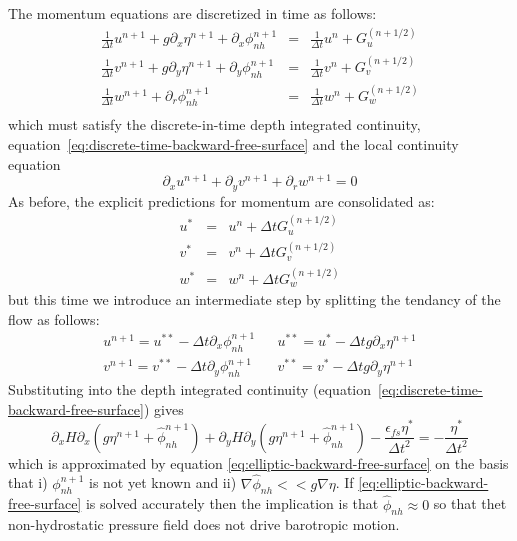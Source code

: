 The momentum equations are discretized in time as follows:
\begin{eqnarray}
\frac{1}{\Delta t} u^{n+1} + g \partial_x \eta^{n+1} + \partial_x \phi_{nh}^{n+1}
& = & \frac{1}{\Delta t} u^{n} + G_u^{(n+1/2)} \label{eq:discrete-time-u-nh} \\
\frac{1}{\Delta t} v^{n+1} + g \partial_y \eta^{n+1} + \partial_y \phi_{nh}^{n+1}
& = & \frac{1}{\Delta t} v^{n} + G_v^{(n+1/2)} \label{eq:discrete-time-v-nh} \\
\frac{1}{\Delta t} w^{n+1} + \partial_r \phi_{nh}^{n+1}
& = & \frac{1}{\Delta t} w^{n} + G_w^{(n+1/2)} \label{eq:discrete-time-w-nh} \\
\end{eqnarray}
which must satisfy the discrete-in-time depth integrated continuity,
equation~\ref{eq:discrete-time-backward-free-surface} and the local continuity equation
\begin{equation}
\partial_x u^{n+1} + \partial_y v^{n+1} + \partial_r w^{n+1} = 0
\label{eq:non-divergence-nh}
\end{equation}
As before, the explicit predictions for momentum are consolidated as:
\begin{eqnarray*}
u^* & = & u^n + \Delta t G_u^{(n+1/2)} \\
v^* & = & v^n + \Delta t G_v^{(n+1/2)} \\
w^* & = & w^n + \Delta t G_w^{(n+1/2)}
\end{eqnarray*}
but this time we introduce an intermediate step by splitting the
tendancy of the flow as follows:
\begin{eqnarray}
u^{n+1} = u^{**} - \Delta t \partial_x \phi_{nh}^{n+1}
& &
u^{**} = u^{*} - \Delta t g \partial_x \eta^{n+1} \\
v^{n+1} = v^{**} - \Delta t \partial_y \phi_{nh}^{n+1}
& &
v^{**} = v^{*} - \Delta t g \partial_y \eta^{n+1}
\end{eqnarray}
Substituting into the depth integrated continuity
(equation~\ref{eq:discrete-time-backward-free-surface}) gives
\begin{equation}
\partial_x H \partial_x \left( g \eta^{n+1} + \widehat{\phi}_{nh}^{n+1} \right)
+
\partial_y H \partial_y \left( g \eta^{n+1} + \widehat{\phi}_{nh}^{n+1} \right)
 - \frac{\epsilon_{fs}\eta^*}{\Delta t^2}
= - \frac{\eta^*}{\Delta t^2}
\end{equation}
which is approximated by equation
\ref{eq:elliptic-backward-free-surface} on the basis that i)
$\phi_{nh}^{n+1}$ is not yet known and ii) $\nabla \widehat{\phi}_{nh}
<< g \nabla \eta$. If \ref{eq:elliptic-backward-free-surface} is
solved accurately then the implication is that $\widehat{\phi}_{nh}
\approx 0$ so that thet non-hydrostatic pressure field does not drive
barotropic motion.

